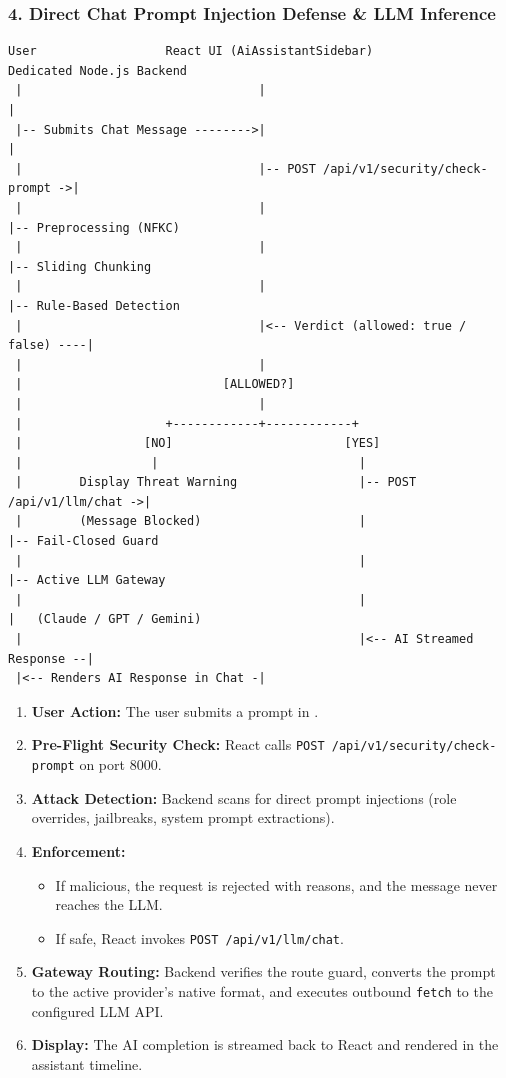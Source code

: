 \documentclass[11pt,a4paper]{article}
\newcommand{\pth}[1]{\texttt{\seqsplit{#1}}}
\begin{document}
\subsubsection{4. Direct Chat Prompt Injection Defense \& LLM Inference}
\begin{lstlisting}
User                  React UI (AiAssistantSidebar)             Dedicated Node.js Backend
 |                                 |                                        |
 |-- Submits Chat Message -------->|                                        |
 |                                 |-- POST /api/v1/security/check-prompt ->|
 |                                 |                                        |-- Preprocessing (NFKC)
 |                                 |                                        |-- Sliding Chunking
 |                                 |                                        |-- Rule-Based Detection
 |                                 |<-- Verdict (allowed: true / false) ----|
 |                                 |
 |                            [ALLOWED?]
 |                                 |
 |                    +------------+------------+
 |                 [NO]                        [YES]
 |                  |                            |
 |        Display Threat Warning                 |-- POST /api/v1/llm/chat ->|
 |        (Message Blocked)                      |                           |-- Fail-Closed Guard
 |                                               |                           |-- Active LLM Gateway
 |                                               |                           |   (Claude / GPT / Gemini)
 |                                               |<-- AI Streamed Response --|
 |<-- Renders AI Response in Chat -|
\end{lstlisting}
\begin{enumerate}[leftmargin=1.4em]
\item \textbf{User Action:} The user submits a prompt in \pth{AiAssistantSidebar.tsx}.
\item \textbf{Pre-Flight Security Check:} React calls \texttt{POST /api/v1/security/check-prompt} on port 8000.
\item \textbf{Attack Detection:} Backend scans for direct prompt injections (role overrides, jailbreaks, system prompt extractions).
\item \textbf{Enforcement:}
  \begin{itemize}
  \item If malicious, the request is rejected with reasons, and the message never reaches the LLM.
  \item If safe, React invokes \texttt{POST /api/v1/llm/chat}.
  \end{itemize}
\item \textbf{Gateway Routing:} Backend verifies the route guard, converts the prompt to the active provider's native format, and executes outbound \texttt{fetch} to the configured LLM API.
\item \textbf{Display:} The AI completion is streamed back to React and rendered in the assistant timeline.
\end{enumerate}
\end{document}
